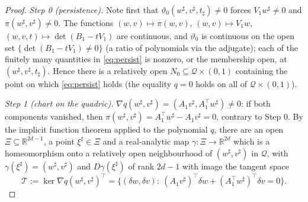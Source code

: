 \documentclass[11pt]{article}
\theoremstyle{definition}
\theoremstyle{remark}
\theoremstyle{plain}
\newcommand{\R}{\mathbb{R}}
\newcommand{\cQ}{\mathcal{Q}}
\newcommand{\cT}{\mathcal{T}}
\begin{document}
\begin{proof}
\emph{Step 0 (persistence).}  Note first that
$\vartheta_0(w^\sharp,v^\sharp,t_\sharp)\neq0$ forces $V_1w^\sharp\neq0$ and
$\pi(w^\sharp,v^\sharp)\neq0$.  The functions
$(w,v)\mapsto\pi(w,v)$, $(w,v)\mapsto V_1w$, $(w,v,t)\mapsto\det(B_1-tV_1)$ are
continuous, and $\vartheta_0$ is continuous on the open set
$\{\det(B_1-tV_1)\neq0\}$ (a ratio of polynomials via the adjugate); each of the
finitely many quantities in \eqref{eq:persist} is nonzero, or the membership open, at
$(w^\sharp,v^\sharp,t_\sharp)$.  Hence there is a relatively open
$N_0\subseteq\cQ\times(0,1)$ containing the point on which \eqref{eq:persist} holds
(the equality $q=0$ holds on all of $\cQ\times(0,1)$).

\emph{Step 1 (chart on the quadric).}  $\nabla q(w^\sharp,v^\sharp)
=(A_1v^\sharp,A_1^\top w^\sharp)\neq0$: if both components vanished, then
$\pi(w^\sharp,v^\sharp)=A_1^\top w^\sharp-A_1v^\sharp=0$, contrary to Step 0.  By the
implicit function theorem applied to the polynomial $q$, there are an open
$\Xi\subseteq\R^{2d-1}$, a point $\xi^\sharp\in\Xi$ and a real-analytic map
$\gamma:\Xi\to\R^{2d}$ which is a homeomorphism onto a relatively open neighbourhood of
$(w^\sharp,v^\sharp)$ in $\cQ$, with $\gamma(\xi^\sharp)=(w^\sharp,v^\sharp)$ and
$D\gamma(\xi^\sharp)$ of rank $2d-1$ with image the tangent space
\[
\cT:=\ker\nabla q(w^\sharp,v^\sharp)^\top
=\big\{(\delta w,\delta v):\ (A_1v^\sharp)^\top\delta w
+(A_1^\top w^\sharp)^\top\delta v=0\big\}.
\]


\end{proof}
\end{document}
